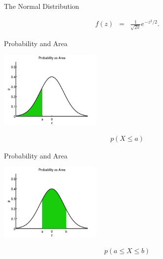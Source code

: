 \begin{frame}{The Normal Distribution}


  \begin{eqnarray*}
    f(z) & = & \frac{1}{\sqrt{2\pi}} e^{-z^2/2}.
  \end{eqnarray*}
  
\end{frame}

\begin{frame}{Probability and Area}

  \includegraphics[width=5cm]{img/standardNormalArea}

  \begin{eqnarray*}
    p(X \leq a) 
  \end{eqnarray*}
  
\end{frame}


\begin{frame}{Probability and Area}

  \includegraphics[width=5cm]{img/standardNormalAreaBoth}

  \begin{eqnarray*}
    p(a \leq X \leq b) 
  \end{eqnarray*}
  
\end{frame}

